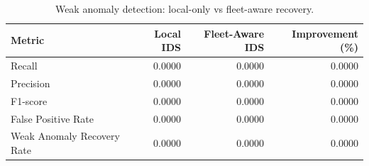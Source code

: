 \begin{table}[t]
\centering
\begin{tabular}{lrrr}
\toprule
Metric & Local IDS & Fleet-Aware IDS & Improvement (\%) \\
\midrule
Recall & 0.0000 & 0.0000 & 0.0000 \\
Precision & 0.0000 & 0.0000 & 0.0000 \\
F1-score & 0.0000 & 0.0000 & 0.0000 \\
False Positive Rate & 0.0000 & 0.0000 & 0.0000 \\
Weak Anomaly Recovery Rate & 0.0000 & 0.0000 & 0.0000 \\
\bottomrule
\end{tabular}
\caption{Weak anomaly detection: local-only vs fleet-aware recovery.}
\label{tab:weak-anomaly-recovery}
\end{table}
